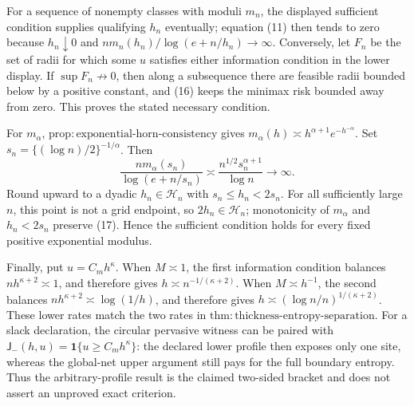 For a sequence of nonempty classes with moduli \(m_n\), the displayed sufficient condition supplies qualifying \(h_n\) eventually; equation (11) then tends to zero because \(h_n\downarrow0\) and \(nm_n(h_n)/\log(e+n/h_n)\to\infty\).  Conversely, let \(F_n\) be the set of radii for which some \(u\) satisfies either information condition in the lower display.  If \(\sup F_n\not\to0\), then along a subsequence there are feasible radii bounded below by a positive constant, and (16) keeps the minimax risk bounded away from zero.  This proves the stated necessary condition.

For \(m_\alpha\), \(\mathrm{prop:exponential\text{-}horn\text{-}consistency}\) gives \(m_\alpha(h)\asymp h^{\alpha+1}e^{-h^{-\alpha}}\).  Set \(s_n=\{(\log n)/2\}^{-1/\alpha}\).  Then
\[
 \frac{nm_\alpha(s_n)}{\log(e+n/s_n)}
 \asymp\frac{n^{1/2}s_n^{\alpha+1}}{\log n}\longrightarrow\infty. \tag{17}
\]
Round upward to a dyadic \(h_n\in\mathcal H_n\) with \(s_n\le h_n<2s_n\).  For all sufficiently large \(n\), this point is not a grid endpoint, so \(2h_n\in\mathcal H_n\); monotonicity of \(m_\alpha\) and \(h_n<2s_n\) preserve (17).  Hence the sufficient condition holds for every fixed positive exponential modulus.

Finally, put \(u=C_mh^\kappa\).  When \(M\asymp1\), the first information condition balances \(nh^{\kappa+2}\asymp1\), and therefore gives \(h\asymp n^{-1/(\kappa+2)}\).  When \(M\asymp h^{-1}\), the second balances \(nh^{\kappa+2}\asymp\log(1/h)\), and therefore gives \(h\asymp(\log n/n)^{1/(\kappa+2)}\).  These lower rates match the two rates in \(\mathrm{thm:thickness\text{-}entropy\text{-}separation}\).  For a slack declaration, the circular pervasive witness can be paired with \(\mathsf J_{-}(h,u)=\mathbf1\{u\ge C_mh^\kappa\}\): the declared lower profile then exposes only one site, whereas the global-net upper argument still pays for the full boundary entropy.  Thus the arbitrary-profile result is the claimed two-sided bracket and does not assert an unproved exact criterion.